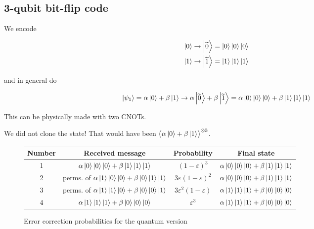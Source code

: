 \documentclass[main.tex]{subfiles}
\begin{document}
\subsection{3-qubit bit-flip code}

We encode

\begin{subequations}
\begin{align}
  \ket{0} \rightarrow \ket{\widetilde{0}} &= \ket{0}\ket{0}\ket{0} \\
  \ket{1} \rightarrow \ket{\widetilde{1}} &= \ket{1}\ket{1}\ket{1}
\end{align}
\end{subequations}

and in general do

\begin{equation}
  \ket{\psi_1} = \alpha \ket{0} + \beta \ket{1} \rightarrow \alpha \ket{\widetilde{0}} + \beta \ket{\widetilde{1}} = \alpha \ket{0}\ket{0}\ket{0} + \beta \ket{1}\ket{1}\ket{1}
\end{equation}

This can be physically made with two CNOTs.

We did not clone the state! That would have been \(\qty(\alpha \ket{0}+\beta \ket{1})^{\otimes 3}\).

\begin{figure}[H]
  \centering
  \begin{tabular}{c|c|c|c}
    Number & Received message & Probability & Final state \\
    \hline
    1 & \(\alpha \ket{0}\ket{0}\ket{0} + \beta \ket{1}\ket{1}\ket{1}\) & \((1-\varepsilon)^3\) & \(\alpha \ket{0}\ket{0}\ket{0} + \beta \ket{1}\ket{1}\ket{1}\) \\
    2 & perms. of \(\alpha \ket{1}\ket{0}\ket{0} + \beta \ket{0}\ket{1}\ket{1}\) & \(3\varepsilon (1-\varepsilon)^2\) & \(\alpha \ket{0}\ket{0}\ket{0} + \beta \ket{1}\ket{1}\ket{1}\) \\
    3 & perms. of \(\alpha \ket{1}\ket{1}\ket{0} + \beta \ket{0}\ket{0}\ket{1}\)  & \(3 \varepsilon ^2 (1-\varepsilon)\) & \(\alpha \ket{1}\ket{1}\ket{1} + \beta \ket{0}\ket{0}\ket{0}\) \\
    4 & \(\alpha \ket{1}\ket{1}\ket{1} + \beta \ket{0}\ket{0}\ket{0}\) & \(\varepsilon^3\) & \(\alpha \ket{1}\ket{1}\ket{1} + \beta \ket{0}\ket{0}\ket{0}\)
  \end{tabular}
  \caption{Error correction probabilities for the quantum version}
  \label{fig:quantum-error-correction}
\end{figure}
\end{document}
